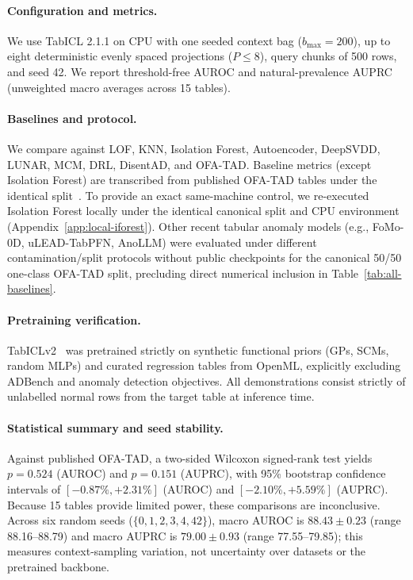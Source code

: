 \documentclass{article}
\begin{document}
\paragraph{Configuration and metrics.}
We use TabICL 2.1.1 on CPU with one seeded context bag ($b_{\max}=200$), up to eight deterministic evenly spaced projections ($P \leq 8$), query chunks of 500 rows, and seed 42. We report threshold-free AUROC and natural-prevalence AUPRC (unweighted macro averages across 15 tables).

\paragraph{Baselines and protocol.}
We compare against LOF, KNN, Isolation Forest, Autoencoder, DeepSVDD, LUNAR, MCM, DRL, DisentAD, and OFA-TAD. Baseline metrics (except Isolation Forest) are transcribed from published OFA-TAD tables under the identical split~\citep{li2026towards}. To provide an exact same-machine control, we re-executed Isolation Forest locally under the identical canonical split and CPU environment (Appendix~\ref{app:local-iforest}). Other recent tabular anomaly models (e.g., FoMo-0D, uLEAD-TabPFN, AnoLLM) were evaluated under different contamination/split protocols without public checkpoints for the canonical 50/50 one-class OFA-TAD split, precluding direct numerical inclusion in Table~\ref{tab:all-baselines}.

\paragraph{Pretraining verification.}
TabICLv2~\citep{qu2026tabiclv2} was pretrained strictly on synthetic functional priors (GPs, SCMs, random MLPs) and curated regression tables from OpenML, explicitly excluding ADBench and anomaly detection objectives. All demonstrations consist strictly of unlabelled normal rows from the target table at inference time.

\paragraph{Statistical summary and seed stability.}
Against published OFA-TAD, a two-sided Wilcoxon signed-rank test yields $p = 0.524$ (AUROC) and $p = 0.151$ (AUPRC), with 95\% bootstrap confidence intervals of $[-0.87\%, +2.31\%]$ (AUROC) and $[-2.10\%, +5.59\%]$ (AUPRC). Because 15 tables provide limited power, these comparisons are inconclusive. Across six random seeds ($\{0, 1, 2, 3, 4, 42\}$), macro AUROC is $88.43 \pm 0.23$ (range 88.16--88.79) and macro AUPRC is $79.00 \pm 0.93$ (range 77.55--79.85); this measures context-sampling variation, not uncertainty over datasets or the pretrained backbone.
\end{document}
